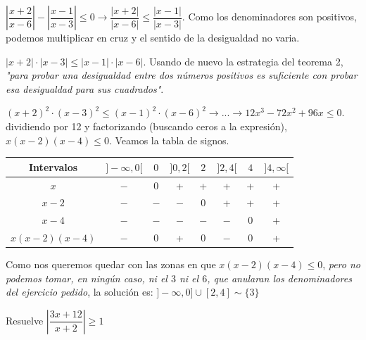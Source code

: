		\begin{proofw}\renewcommand{\qedsymbol}{$\diamond$}
		
			$\left| \dfrac {x+2}{x-6} \right| - \left| \dfrac {x-1}{x-3} \right| \le 0 \to \dfrac {|x+2|}{|x-6|} \le  \dfrac {|x-1|}{|x-3|} $. Como los denominadores son positivos, podemos multiplicar en cruz y el sentido de la desigualdad no varia.
			
			$|x+2|\cdot |x-3|\le |x-1| \cdot |x-6|$. Usando de nuevo la estrategia del teorema 2, 
				\emph{"para probar una desigualdad entre dos números positivos es suficiente con probar esa desigualdad para sus cuadrados"}.
			
			$(x+2)^2\cdot (x-3)^2\le (x-1)^2 \cdot(x-6)^2 \to ... \to 12x^3-72x^2+96x \le 0 $. dividiendo por 12 y factorizando (buscando ceros a la expresión), $x(x-2)(x-4)\le 0$. Veamos la tabla de signos.
			
			
	\begin{table}[H]
	\centering
	\begin{tabular}{|c|c|c|c|c|c|c|c|}
	\hline
	 Intervalos &$]-\infty, 0[$  &$0$  &$]0,2[$  &$2$ & $]2,4[$ & $4$ & $]4,\infty[$ \\ \hline
	 $x$& $-$ & 0 & + & + & + & + & + \\ \hline
 	 $x-2$& $-$ & $-$ & $-$ & 0 & + & + & + \\ \hline
 	 $x-4$& $-$ & $-$ & $-$ & $-$ & $-$ & 0 & +\\ \hline
 	 $x(x-2)(x-4)$& $-$ & 0 & + & 0 & $-$ & 0 & +\\ \hline
	\end{tabular}
	\end{table}
			
			Como nos queremos quedar con las zonas en que $x(x-2)(x-4)\le 0$, \emph{pero no podemos tomar, en ningún caso, ni el $3$ ni el $6$, que anularan los denominadores del ejercicio pedido}, la solución es:  $]-\infty, 0] \cup [2,4] \sim \{ 3 \}$



		\end{proofw}
		
		\begin{ejre}
			Resuelve $\left| \dfrac {3x+12}{x+2} \right| \ge 1$
		\end{ejre}
		
